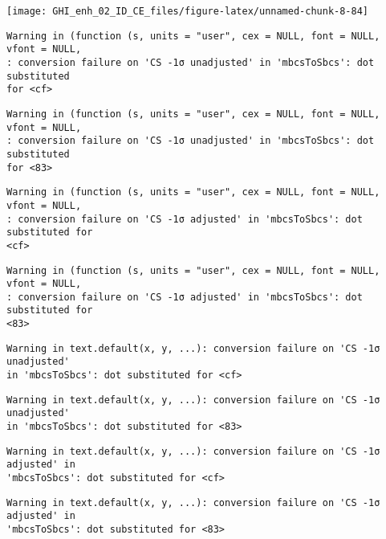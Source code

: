 \documentclass[
  10pt,
  a4paper,oneside]{article}
\begin{document}
\begin{center}\texttt{[image: GHI\_enh\_02\_ID\_CE\_files/figure-latex/unnamed-chunk-8-84]} \end{center}

\begin{verbatim}
Warning in (function (s, units = "user", cex = NULL, font = NULL, vfont = NULL,
: conversion failure on 'CS -1σ unadjusted' in 'mbcsToSbcs': dot substituted
for <cf>
\end{verbatim}

\begin{verbatim}
Warning in (function (s, units = "user", cex = NULL, font = NULL, vfont = NULL,
: conversion failure on 'CS -1σ unadjusted' in 'mbcsToSbcs': dot substituted
for <83>
\end{verbatim}

\begin{verbatim}
Warning in (function (s, units = "user", cex = NULL, font = NULL, vfont = NULL,
: conversion failure on 'CS -1σ adjusted' in 'mbcsToSbcs': dot substituted for
<cf>
\end{verbatim}

\begin{verbatim}
Warning in (function (s, units = "user", cex = NULL, font = NULL, vfont = NULL,
: conversion failure on 'CS -1σ adjusted' in 'mbcsToSbcs': dot substituted for
<83>
\end{verbatim}

\begin{verbatim}
Warning in text.default(x, y, ...): conversion failure on 'CS -1σ unadjusted'
in 'mbcsToSbcs': dot substituted for <cf>
\end{verbatim}

\begin{verbatim}
Warning in text.default(x, y, ...): conversion failure on 'CS -1σ unadjusted'
in 'mbcsToSbcs': dot substituted for <83>
\end{verbatim}

\begin{verbatim}
Warning in text.default(x, y, ...): conversion failure on 'CS -1σ adjusted' in
'mbcsToSbcs': dot substituted for <cf>
\end{verbatim}

\begin{verbatim}
Warning in text.default(x, y, ...): conversion failure on 'CS -1σ adjusted' in
'mbcsToSbcs': dot substituted for <83>
\end{verbatim}
\end{document}
